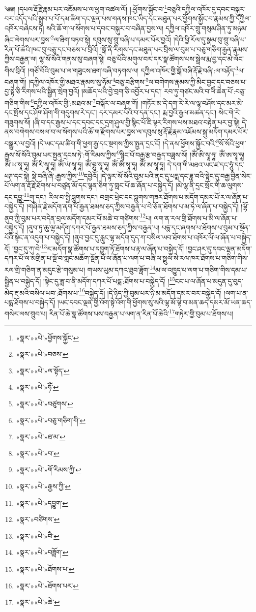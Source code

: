 ༄༅། །དཔལ་རྡོ་རྗེ་རྣམ་པར་འཇོམས་པ་ལ་ཕྱག་འཚལ་ལོ། །:ཕྱོགས་སྐྱོང་བ་\footnote{«སྣར་»«པེ་»ཕྱོགས་སྐྱོང་}བཅུའི་དཀྱིལ་འཁོར་དུ་དབང་བསྐུར་བར་འདོད་པའི་སྒྲུབ་པ་པོ་དམ་ཚིག་དང་ལྡན་པས་གནས་ཁང་ཡིད་དང་མཐུན་པར་ཕྱོགས་སྐྱོང་བ་རྣམས་ཀྱི་དཀྱིལ་འཁོར་བཞེངས་ཏེ། སའི་ཆོ་ག་ལ་སོགས་པ་དབང་བསྐུར་བ་བཞིན་བྱས་ལ། དཀྱིལ་འཁོར་གྲུ་གསུམ་ཤིན་ཏུ་མཉམ་ཞིང་ལེགས་པར་བྱས་\footnote{«སྣར་»«པེ་»བཅས་}ལ་ཐིག་བཏབ་སྟེ། དབུས་སུ་གྲུ་བཞི་པ་དམར་པོར་བྱའོ། །དེའི་ཕྱི་རོལ་དུ་སྣམ་བུ་གྲུ་བཞི་པ་རིན་པོ་ཆེའི་ཁང་བུ་བཅུ་དང་བཅས་པ་བྲིའོ། །སྒོ་ནི་རིགས་དང་མཐུན་པར་བྲིས་ལ་བུམ་པ་བཅུ་གཅིག་རྒྱན་རྣམས་ཀྱིས་བརྒྱན་ལ། ལྷ་སོ་སོའི་གནས་སུ་བཞག་སྟེ། བཅུ་པོའི་མགུལ་བར་དར་སྣ་ཚོགས་པས་སྦྲེལ་རྨ་བྱ་དང་མེ་ལོང་གིས་བྲིའོ། །གཙོ་བོའི་བུམ་པ་ལ་གཟུངས་ཐག་བཞི་བཏགས་ལ། དཀྱིལ་འཁོར་གྱི་སྒོ་བཞི་རྡོ་རྗེ་བཞི་:ལ་བརྟོད་\footnote{«སྣར་»«པེ་»ལ་སྟོད་}ལ་བཞག་གོ། །དཀྱིལ་འཁོར་གྱི་མཐའ་རྣམས་སུ་ཧོམ་\footnote{«སྣར་»«པེ་»ཧོཾ་}བཅུ་བརྩིགས་\footnote{«སྣར་»«པེ་»བཙུགས་}ལ་བགེགས་རྣམས་ཀྱི་མིང་བྱང་དང་བཅས་པ་བྱ་སྟེ་ཅི་རིགས་པའི་སྦྱིན་སྲེག་བྱའོ། །མཆོད་པའི་བྱེ་བྲག་ཅི་འབྱོར་པ་དང་། རབ་ཏུ་གཙང་མའི་བ་ལིཾ་ཆེན་པོ་:བཅུ་གཅིག་གིས་\footnote{«སྣར་»«པེ་»བཅུ་གཅིག་གི་}དཀྱིལ་འཁོར་གྱི་:མཐའ་མ་\footnote{«སྣར་»«པེ་»ཐ་མ་}བསྐོར་ལ་བཞག་གོ། །གཏོར་མ་དེ་དག་རེ་རེ་ལ་ལྷ་བཤོས་དང་མར་མེ་དང་སྤོས་དང་ཤོག་ཤོག་གི་གདུགས་རེ་དང་། དར་དམར་པོའི་བ་དན་དང་། རྨ་བྱའི་རྒྱལ་མཚན་དང་། སེང་གེ་རེ་གཟུགས་སོ། །ཞི་བ་དང་རྒྱས་པ་དང་དབང་དང་དྲག་ཤུལ་གྱི་སྙིང་པོ་ཇི་ལྟར་རིགས་པས་མཐའ་བརྟེན་པར་བྱ་སྟེ། དེ་ནས་བགེགས་བསལ་བ་ལ་སོགས་པའི་ཆོ་ག་རྫོགས་པར་བྱས་ལ་དབུས་སུ་རྡོ་རྗེ་རྣམ་འཇོམས་སྐུ་མདོག་དམར་པོར་བསྒྱུར་ལ་བྱའོ། །དེ་ཡང་དམ་ཚིག་གི་ཕྱག་རྒྱ་དང་སྔགས་ཀྱིས་སྤྱན་དྲང་ངོ། །དེ་ནས་ཕྱོགས་སྐྱོང་བའི་\footnote{«སྣར་»«པེ་»བ་}སོ་སོའི་ཕྱག་རྒྱས་སོ་སོའི་བུམ་པར་སྤྱན་དྲངས་ཏེ་:གོ་རིམས་ཀྱིས་\footnote{«སྣར་»«པེ་»གོ་རིམས་ཀྱི་}སྙིང་པོ་བརྒྱ་རྩ་བརྒྱད་བཟླས་སོ། །ཨོཾ་ཨི་སྭཱ་ཧཱ། ཨོཾ་ཨ་སྭཱ་ཧཱ། ཨོཾ་ཡ་སྭཱ་ཧཱ། ཨོཾ་རི་སྭཱ་ཧཱ། ཨོཾ་ཡཾ་སྭཱ་ཧཱ། ཨོཾ་བྷུ་སྭཱ་ཧཱ། ཨོཾ་ཨིཾ་སྭཱ་ཧཱ། ཨོཾ་ཨ་སྭཱ་ཧཱ། དེ་དག་གི་མཐའ་ཡང་ཛ་དང་ཧཱུཾ་དང་ཕཊ་དང་སྟེ། སྡེ་བཞི་ཞི་:རྒྱས་ཀྱིས་\footnote{«སྣར་»«པེ་»རྒྱས་ཀྱི་}དབྱེའོ། །དེ་ལྟར་སོ་སོའི་བུམ་པའི་ནང་དུ་པདྨ་དང་ཟླ་བའི་སྟེང་དུ་བརྒྱ་བྱིན་སེར་པོ་ལག་ན་རྡོ་རྗེ་ཐོགས་པ་བཙུན་མོ་དང་ལྷན་ཅིག་ཏུ་གླང་པོ་ཆ་ཞོན་པ་བསྐྱེད་དོ། །མེ་ལྷ་ནི་དྲང་སྲོང་གི་ཆ་ལུགས་དང་དབྱུ་\footnote{«སྣར་»«པེ་»དབྱུག་}གུ་དང་། རིལ་བ་སྤྱི་བླུགས་དང་། བགྲང་ཕྲེང་དང་བླུགས་གཟར་ཐོགས་པ་མདོག་དམར་པོ་ར་ལ་ཞོན་པ་བསྐྱེད་དོ། །གཤིན་རྗེ་མདོག་ནག་པོ་རྒྱན་ཐམས་ཅད་ཀྱིས་བརྒྱན་པ་བེ་ཅོན་ཐོགས་པ་མ་ཧེ་ལ་ཞོན་པ་བསྐྱེད་དོ། །ལྷོ་ནུབ་ཀྱི་བུམ་པར་བདེན་བྲལ་མདོག་དམར་པོ་མཆེ་བ་གཙིགས་\footnote{«སྣར་»བཙིགས་}པ། ལག་ན་རལ་གྲི་ཐོགས་པ་མི་ལ་ཞོན་པ་བསྐྱེད་དོ། །ནུབ་ཏུ་ཆུ་ལྷ་མདོག་དཀར་པོ་རྒྱན་ཐམས་ཅད་ཀྱིས་བརྒྱན་པ། པདྨ་དང་ཞགས་པ་ཐོགས་པ་བུམ་པ་སྔོན་པོའི་སྟེང་ན་འདུག་པ་བསྐྱེད་དོ། །ནུབ་བྱང་དུ་རླུང་ལྷ་མདོག་དུད་ཀ་བསིལ་ཡབ་ཐོགས་པ་འཁོར་ལོ་ལ་ཞོན་པ་བསྐྱེད་དོ། །བྱང་དུ་ཀུ་བེ་\footnote{«སྣར་»«པེ་»བཻ་}ར་མདོག་སྣ་ཚོགས་པ་དབྱུག་ཏོ་ཐོགས་པ་རྟ་ལ་ཞོན་པ་བསྐྱེད་དོ། །བྱང་ཤར་དུ་དབང་ལྡན་མདོག་དཀར་པོ་ལ་མགྲིན་པ་སྔོ་བ་གླང་མཆོག་སྔོན་པོ་ལ་ཞོན་པ་ལག་པ་བཞི་ལ་སྦྲུལ་སེ་རལ་ཁར་ཐོགས་པ་གཅིག་གིས་རལ་གྲི་གཅིག་ན་མདུང་རྩེ་གསུམ་པ། གཡས་ཡུམ་དཀའ་ཐུབ་ཟློག་\footnote{«སྣར་»«པེ་»བཟློག་}མ་ལ་འཁྱུད་པ་ལག་པ་གཅིག་གིས་དམ་པ་སྦྱིན་པ་བསྐྱེད་དོ། །སྟེང་དུ་ཟླ་བ་ནི་མདོག་དཀར་པོ་པདྨ་:ཐོགས་པ་བསྐྱེད་དོ། །\footnote{«སྣར་»«པེ་»ཐོགས་པ་}ངང་པ་ལ་ཞོན་པ་མདུན་དུ་བུད་མེད་རྔ་མའི་བསིལ་ཡབ་:ཐོགས་པ་\footnote{«སྣར་»«པེ་»ཐོགས་པར་}བསྐྱེད་དོ། །དེ་ཉིད་ཀྱི་བུམ་པར་ཉི་མ་མདོག་དམར་བར་བསྐྱེད་དོ། །ལག་པ་ན་པདྨ་ཐོགས་པ་བསྐྱེད་དོ། །ཡང་དབང་ལྡན་གྱི་འོག་སྟེ་འོག་གི་ཕྱོགས་སུ་སའི་ལྷ་མོ་ལྟེ་བ་མན་ཆད་དམར་མོ་ཡན་ཆད་གསེར་ལས་གྲུབ་པ། རིན་པོ་ཆེ་སྣ་ཚོགས་པས་བརྒྱན་པ་ལག་ན་རིན་པོ་ཆེའི་\footnote{«སྣར་»«པེ་»ཆེ་}གཏེར་གྱི་བུམ་པ་ཐོགས་པ། 